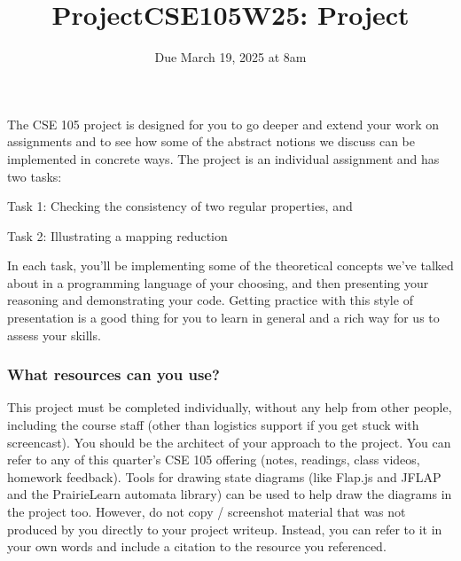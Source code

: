
\titleformat{\subsubsection}[runin]
   {\normalfont\bfseries}{}{}{}
   
\title{ProjectCSE105W25: Project}
\date{Due March 19, 2025 at 8am}


\maketitle

\thispagestyle{fancy}


\vspace{-20pt}

The CSE 105 project is designed for you to go deeper and 
extend your work on assignments 
and to see how some of the abstract notions we discuss can 
be implemented in concrete ways. 
The project is an individual assignment and has two tasks: 

Task 1: Checking the consistency of two regular properties, and

\vspace{-15pt}

Task 2: Illustrating a mapping reduction

In each task, you'll be implementing some of the theoretical concepts we've talked about in a programming language of your choosing, and then presenting your reasoning and demonstrating your code. Getting practice with this 
style of presentation is a good thing  for you to learn in general and a rich 
way for us to assess your skills. 

\vspace{-20pt}

\subsubsection*{What resources can you use?} This project must be completed individually, 
without any help from other people, including the course staff (other than logistics support if 
you get stuck with screencast). You should be the architect of your approach to the project.
You can refer to any of this quarter's CSE 105 offering (notes, readings, class videos, homework feedback). 
Tools for drawing state diagrams (like Flap.js and JFLAP and the PrairieLearn automata library) can be used to help draw the diagrams 
in the project too. However, do not copy / screenshot material that was not produced by you directly to your project writeup. Instead, you can refer to it in your own words and include a citation to the resource you referenced.

